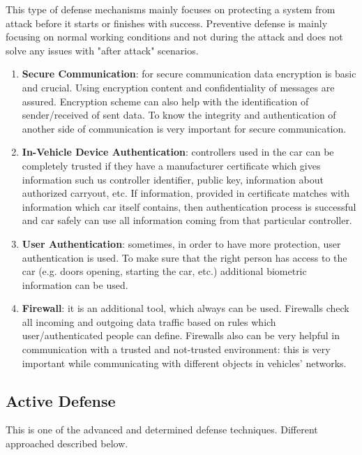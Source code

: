 This type of defense mechanisms mainly focuses on protecting a system from attack before it starts or finishes with success. Preventive defense is mainly focusing on normal working conditions and not during the attack and does not solve any issues with "after attack" scenarios.	
\begin{enumerate}
	\item \textbf{Secure Communication}: for secure communication data encryption is basic and crucial. Using encryption content and confidentiality of messages are assured. Encryption scheme can also help with the identification of sender/received of sent data. To know the integrity and authentication of another side of communication is very important for secure communication.
	\item \textbf{In-Vehicle Device Authentication}: controllers used in the car can be completely trusted if they have a manufacturer certificate which gives information such us controller identifier, public key, information about authorized carryout, etc. If information, provided in certificate matches with information which car itself contains, then authentication process is successful and car safely can use all information coming from that particular controller.  
	\item \textbf{User Authentication}: sometimes, in order to have more protection, user authentication is used. To make sure that the right person has access to the car (e.g. doors opening, starting the car, etc.) additional biometric information can be used. 
	\item \textbf{Firewall}: it is an additional tool, which always can be used. Firewalls check all incoming and outgoing data traffic based on rules which user/authenticated people can define. Firewalls also can be very helpful in communication with a trusted and not-trusted environment: this is very important while communicating with different objects in vehicles' networks.
\end{enumerate}
		
\subsection{Active Defense}
This is one of the advanced and determined defense techniques. Different approached described below.	

